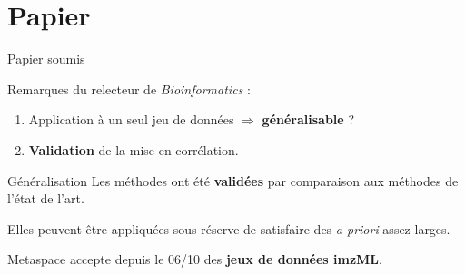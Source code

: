 \documentclass[10pt]{beamer}
\begin{document}
\section{Papier}

\begin{frame}{Papier soumis}
  
  Remarques du relecteur de \textit{Bioinformatics} :
  \begin{enumerate}
  \item Application à un seul jeu de données $\Rightarrow$ \textbf{généralisable} ?
  \item \textbf{Validation} de la mise en corrélation.
  \end{enumerate}


\end{frame}

\begin{frame}{Généralisation}
  Les méthodes ont été \textbf{validées} par comparaison aux méthodes de l'état de l'art.

  Elles peuvent être appliquées sous réserve de satisfaire des \textit{a priori} assez larges.

  \vspace{0.3cm}

  Metaspace accepte depuis le 06/10 des \textbf{jeux de données imzML}.
\end{frame}
\end{document}
